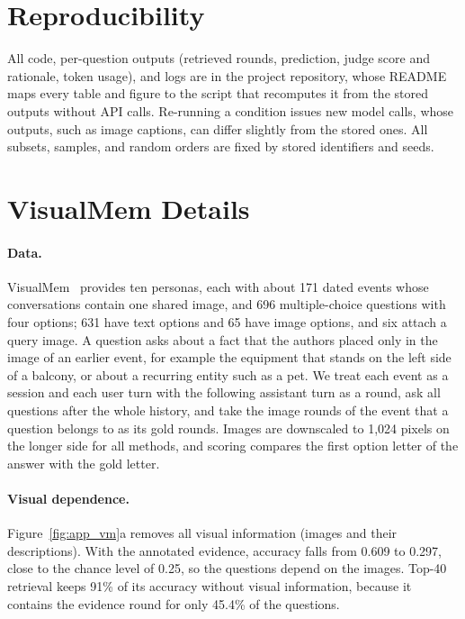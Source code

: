 \section{Reproducibility}
\label{app:repro}

All code, per-question outputs (retrieved rounds, prediction, judge score and rationale, token usage), and logs are in the project repository, whose README maps every table and figure to the script that recomputes it from the stored outputs without API calls. Re-running a condition issues new model calls, whose outputs, such as image captions, can differ slightly from the stored ones. All subsets, samples, and random orders are fixed by stored identifiers and seeds.

\section{VisualMem Details}
\label{app:visualmem}

\paragraph{Data.} VisualMem~\citep{nguyen2026personalvisual} provides ten personas, each with about 171 dated events whose conversations contain one shared image, and 696 multiple-choice questions with four options; 631 have text options and 65 have image options, and six attach a query image. A question asks about a fact that the authors placed only in the image of an earlier event, for example the equipment that stands on the left side of a balcony, or about a recurring entity such as a pet. We treat each event as a session and each user turn with the following assistant turn as a round, ask all questions after the whole history, and take the image rounds of the event that a question belongs to as its gold rounds. Images are downscaled to 1,024 pixels on the longer side for all methods, and scoring compares the first option letter of the answer with the gold letter.

\paragraph{Visual dependence.} Figure~\ref{fig:app_vm}a removes all visual information (images and their descriptions). With the annotated evidence, accuracy falls from 0.609 to 0.297, close to the chance level of 0.25, so the questions depend on the images. Top-40 retrieval keeps 91\% of its accuracy without visual information, because it contains the evidence round for only 45.4\% of the questions.

